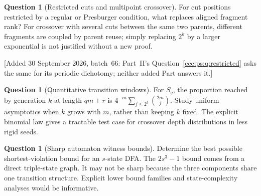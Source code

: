 \documentclass[11pt,letterpaper]{article}
\theoremstyle{definition}
\newtheorem{question}[theorem]{Question}
\theoremstyle{remark}
\newcommand{\wadd}[1]{\textup{[}Added 30 September 2026, batch~66: #1\textup{]}}
\begin{document}
\begin{question}[Restricted cuts and multipoint crossover]\label{ccc:q:restricted}
For cut positions restricted by a regular or Presburger condition, what
replaces aligned fragment rank? For crossover with several cuts between the
same two parents, different fragments are coupled by parent reuse; simply
replacing $2^k$ by a larger exponential is not justified without a new proof.
\end{question}
\wadd{Part~II's Question~\ref{ccc:ps:q:restricted} asks the same for its
periodic dichotomy; neither added Part answers it.}

\begin{question}[Quantitative transition windows]
For $S_q$, the proportion reached by generation $k$ at length $qm+r$ is
$4^{-m}\sum_{j\leq2^k}\binom{2m}{j}$. Study uniform asymptotics when $k$ grows
with $m$, rather than keeping $k$ fixed. The explicit binomial law gives a
tractable test case for crossover depth distributions in less rigid seeds.
\end{question}

\begin{question}[Sharp automaton witness bounds]
Determine the best possible shortest-violation bound for an $s$-state DFA.
The $2s^3-1$ bound comes from a direct triple-state graph. It may not be sharp
because the three components share one transition structure. Explicit lower
bound families and state-complexity analyses would be informative.
\end{question}
\end{document}
